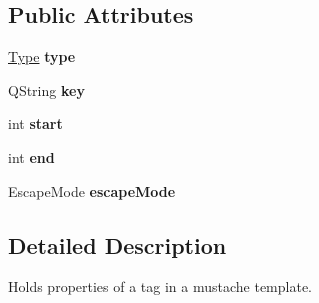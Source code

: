 \subsection*{Public Attributes}
\begin{DoxyCompactItemize}
\item 
\hypertarget{structMustache_1_1Tag_ad58b3b921b7e84c31efd88864c2040d4}{\hyperlink{structMustache_1_1Tag_ab702ed1288811f8bb16d76babfdb6472}{Type} {\bfseries type}}\label{structMustache_1_1Tag_ad58b3b921b7e84c31efd88864c2040d4}

\item 
\hypertarget{structMustache_1_1Tag_a25f46abd595426bc00230f69215db567}{Q\-String {\bfseries key}}\label{structMustache_1_1Tag_a25f46abd595426bc00230f69215db567}

\item 
\hypertarget{structMustache_1_1Tag_a4f967c59794b9dd5d711fa7a1d5aff43}{int {\bfseries start}}\label{structMustache_1_1Tag_a4f967c59794b9dd5d711fa7a1d5aff43}

\item 
\hypertarget{structMustache_1_1Tag_a9fc4a5ccee302e0bd9833ec2dd30bc3d}{int {\bfseries end}}\label{structMustache_1_1Tag_a9fc4a5ccee302e0bd9833ec2dd30bc3d}

\item 
\hypertarget{structMustache_1_1Tag_a2ce4c079ced32e8e4cadeca893a886a2}{Escape\-Mode {\bfseries escape\-Mode}}\label{structMustache_1_1Tag_a2ce4c079ced32e8e4cadeca893a886a2}

\end{DoxyCompactItemize}


\subsection{Detailed Description}
Holds properties of a tag in a mustache template. 

